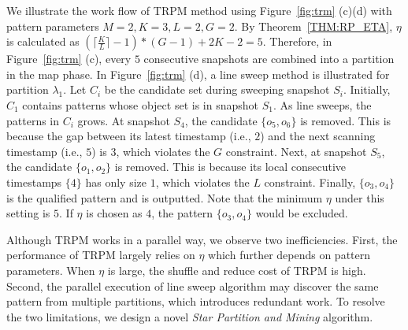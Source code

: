 

\begin{example}
We illustrate the work flow of TRPM method using Figure~\ref{fig:trm} (c)(d) with pattern
parameters $M=2, K=3, L = 2, G=2$. By Theorem~\ref{THM:RP_ETA}, $\eta$ is calculated
as $(\lceil \frac{K}{L} \rceil-1) *(G-1)+2K - 2 = 5$. Therefore, 
in Figure~\ref{fig:trm} (c), every $5$ consecutive snapshots are combined 
into a partition in the map phase. In Figure~\ref{fig:trm} (d), a line sweep
method is illustrated for partition $\lambda_1$. Let $C_i$ be the candidate set
during sweeping snapshot $S_i$.
Initially, $C_1$ contains patterns whose object set is in snapshot $S_1$.
As line sweeps, the patterns in $C_i$ grows. At snapshot $S_4$, the candidate
$\{o_5,o_6\}$ is removed. This is because the gap between its latest timestamp (i.e., $2$)
and the next scanning timestamp (i.e., $5$) is $3$, which violates the $G$ constraint.
Next, at snapshot $S_5$, the candidate $\{o_1,o_2\}$ is removed. This is
because its local consecutive timestamps $\{4\}$ has only size $1$,
which violates the $L$ constraint.
Finally, $\{o_3,o_4\}$ is the qualified pattern and is outputted. Note that the minimum $\eta$
under this setting is $5$. If $\eta$ is chosen as $4$, the pattern $\{o_3,o_4\}$ would be excluded. 
\end{example}


%
%
Although TRPM works in a parallel way, we observe two inefficiencies. First, the
performance of TRPM largely relies on $\eta$ which further depends on pattern parameters.
When $\eta$ is large, the shuffle and reduce cost of TRPM is high. Second, 
the parallel execution of line sweep algorithm may discover the same pattern from
multiple partitions, which introduces redundant work. To resolve the two limitations,
we design a novel \emph{Star Partition and Mining} algorithm.